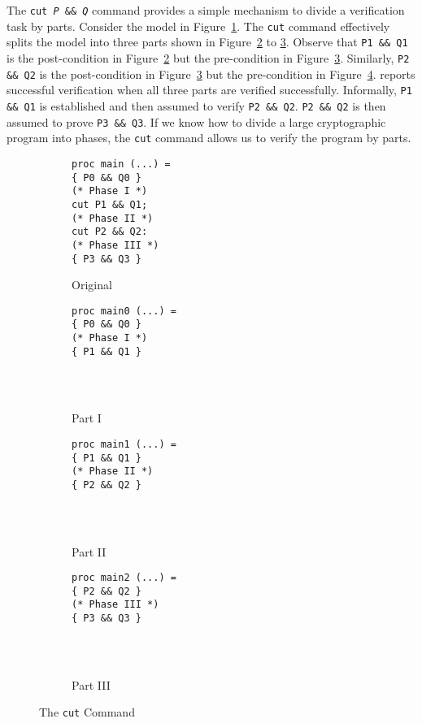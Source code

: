 \documentclass{amsproc}
\begin{document}
The \cryptoline \texttt{cut \textit{P} \&\& \textit{Q}} command
provides a simple mechanism to divide a verification task by
parts. Consider the \cryptoline model in
Figure~\ref{figure:cut:original}. The \texttt{cut} command effectively
splits the model into three parts shown in Figure~\ref{figure:cut:i}
to \ref{figure:cut:ii}. Observe that \texttt{P1 \&\& Q1} is the
post-condition in Figure~\ref{figure:cut:i} but the pre-condition in
Figure~\ref{figure:cut:ii}. Similarly, \texttt{P2 \&\& Q2} is the
post-condition in Figure~\ref{figure:cut:ii} but the pre-condition in
Figure~\ref{figure:cut:iii}. \cryptoline reports successful
verification when all three parts are verified successfully.
Informally, \texttt{P1 \&\& Q1} is established and then assumed to
verify \texttt{P2 \&\& Q2}. \texttt{P2 \&\& Q2} is then assumed to
prove \texttt{P3 \&\& Q3}. If we know how to divide a large
cryptographic program into phases, the \texttt{cut} command allows us
to verify the program by parts.

\begin{figure}
  \centering
  \begin{subfigure}{.24\columnwidth}
\begin{verbatim}
proc main (...) =
{ P0 && Q0 }
(* Phase I *)
cut P1 && Q1;
(* Phase II *)
cut P2 && Q2:
(* Phase III *)
{ P3 && Q3 }
\end{verbatim}
  \caption{Original}
  \label{figure:cut:original}
  \end{subfigure}
  \begin{subfigure}{.24\columnwidth}
\begin{verbatim}
proc main0 (...) =
{ P0 && Q0 }
(* Phase I *)
{ P1 && Q1 }




\end{verbatim}
  \caption{Part I}
  \label{figure:cut:i}
  \end{subfigure}
  \begin{subfigure}{.24\columnwidth}
\begin{verbatim}
proc main1 (...) =
{ P1 && Q1 }
(* Phase II *)
{ P2 && Q2 }




\end{verbatim}
  \caption{Part II}
  \label{figure:cut:ii}
  \end{subfigure}
  \begin{subfigure}{.24\columnwidth}
\begin{verbatim}
proc main2 (...) =
{ P2 && Q2 }
(* Phase III *)
{ P3 && Q3 }




\end{verbatim}
  \caption{Part III}
  \label{figure:cut:iii}
  \end{subfigure}
  \caption{The \cryptoline \texttt{cut} Command}
  \label{figure:cut}
\end{figure}
\end{document}
